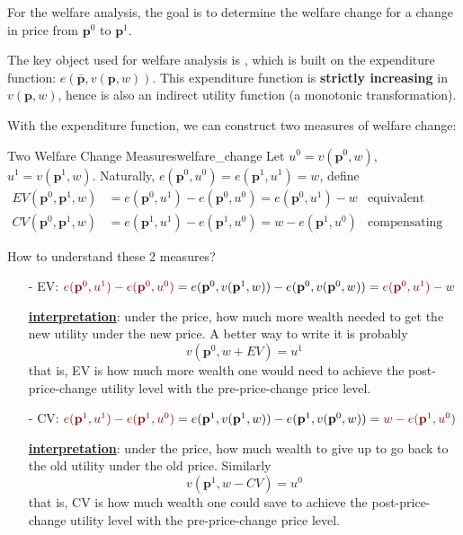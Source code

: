 For the welfare analysis, the goal is to determine the welfare change for a change in price from $\mathbf{p}^0$ to $\mathbf{p}^1$.

The key object used for welfare analysis is , which is built on the expenditure function: $e(\bar{\mathbf{p}},v(\mathbf{p},w))$. This expenditure function is \textbf{strictly increasing} in $v(\mathbf{p},w)$, hence is also an indirect utility function (a monotonic transformation).

With the expenditure function, we can construct two measures of welfare change:
\begin{definition}{Two Welfare Change Measures}{welfare_change}
    Let $u^0 = v(\mathbf{p}^0,w)$, $u^1 = v(\mathbf{p}^1,w)$. Naturally, $e(\mathbf{p}^0,u^0)=e(\mathbf{p}^1,u^1)=w$, define
    \begin{align*}
        EV(\mathbf{p}^0,\mathbf{p}^1,w) &=e(\mathbf{p}^0,u^1)-e(\mathbf{p}^0,u^0)=e(\mathbf{p}^0,u^1)-w & \text{equivalent variation}\\
        CV(\mathbf{p}^0,\mathbf{p}^1,w) &=e(\mathbf{p}^1,u^1)-e(\mathbf{p}^1,u^0)=w-e(\mathbf{p}^1,u^0) & \text{compensating variation}
    \end{align*}
\end{definition}

How to understand these 2 measures?

\begin{itemize}
    \item[-] EV: ${\color{red!55!black}e(\mathbf{p}^0,u^1)-e(\mathbf{p}^0,u^0)} = e(\mathbf{p}^0,v(\mathbf{p}^1,w))-e(\mathbf{p}^0,v(\mathbf{p}^0,w)) = {\color{red!55!black}e(\mathbf{p}^0,u^1)-w}$
    
    \underline{\textbf{interpretation}}: under the  price, how much more wealth needed to get the new utility under the new price. A better way to write it is probably
    $$
    v \left(\mathbf{p}^0, w+EV \right)=u^1
    $$
    that is, EV is how much more wealth one would need to achieve the post-price-change utility level with the pre-price-change price level.
    
    \item[-] CV: ${\color{red!55!black}e(\mathbf{p}^1,u^1)-e(\mathbf{p}^1,u^0)} = e(\mathbf{p}^1,v(\mathbf{p}^1,w))-e(\mathbf{p}^1,v(\mathbf{p}^0,w)) = {\color{red!55!black}w- e(\mathbf{p}^1,u^0)}$
    
    \underline{\textbf{interpretation}}: under the  price, how much wealth to give up to go back to the old utility under the old price. Similarly
    $$
    v \left(\mathbf{p}^1, w-CV \right)=u^0
    $$
    that is, CV is how much wealth one could save to achieve the post-price-change utility level with the pre-price-change price level.
\end{itemize}